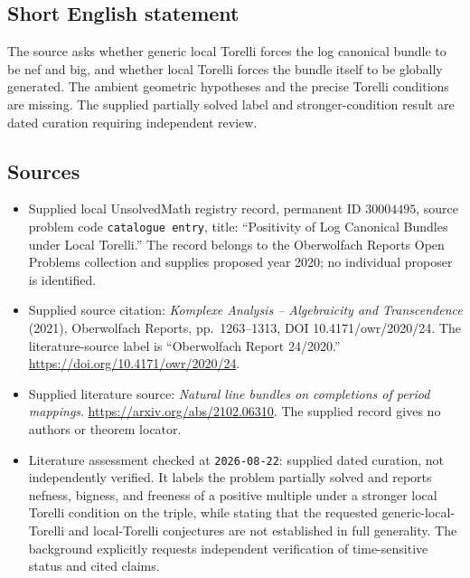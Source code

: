 \documentclass[11pt]{article}
\begin{document}
\subsection{Short English statement}
The source asks whether generic local Torelli forces the log canonical bundle to be nef and big, and whether local Torelli forces the bundle itself to be globally generated. The ambient geometric hypotheses and the precise Torelli conditions are missing. The supplied partially solved label and stronger-condition result are dated curation requiring independent review.
\subsection{Sources}
\begin{itemize}
\item Supplied local UnsolvedMath registry record, permanent ID \(30004495\), source problem code \texttt{catalogue entry}, title: ``Positivity of Log Canonical Bundles under Local Torelli.'' The record belongs to the Oberwolfach Reports Open Problems collection and supplies proposed year 2020; no individual proposer is identified.
\item Supplied source citation: \emph{Komplexe Analysis -- Algebraicity and Transcendence} (2021), Oberwolfach Reports, pp.\ 1263--1313, DOI 10.4171/owr/2020/24. The literature-source label is ``Oberwolfach Report 24/2020.'' \url{https://doi.org/10.4171/owr/2020/24}.
\item Supplied literature source: \emph{Natural line bundles on completions of period mappings}. \url{https://arxiv.org/abs/2102.06310}. The supplied record gives no authors or theorem locator.
\item Literature assessment checked at \texttt{2026-08-22}: supplied dated curation, not independently verified. It labels the problem partially solved and reports nefness, bigness, and freeness of a positive multiple under a stronger local Torelli condition on the triple, while stating that the requested generic-local-Torelli and local-Torelli conjectures are not established in full generality. The background explicitly requests independent verification of time-sensitive status and cited claims.
\end{itemize}
\end{document}
